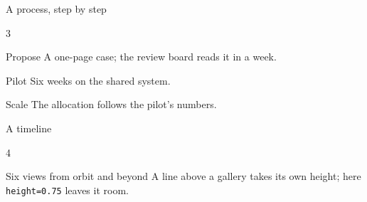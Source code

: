 \documentclass[aspectratio=\engineaspectratio]{beamer}
\begin{document}
\begin{frame}{A process, step by step}
  \begin{enginesteps}{3}
    \begin{enginestep}{Propose}
      A one-page case; the review board reads it in a week.
    \end{enginestep}
    \begin{enginestep}{Pilot}
      Six weeks on the shared system.

    \end{enginestep}
    \begin{enginestep}{Scale}
      The allocation follows the pilot's numbers.
    \end{enginestep}
  \end{enginesteps}
\end{frame}

\begin{frame}{A timeline}
  \begin{enginetimeline}{4}
  \end{enginetimeline}
\end{frame}

\begin{frame}{Six views from orbit and beyond}
  A line above a gallery takes its own height; here \texttt{height=0.75} leaves it room.
  \begin{enginegallery}[cols=3,rows=2,height=0.75]
  \end{enginegallery}
\end{frame}
\end{document}
